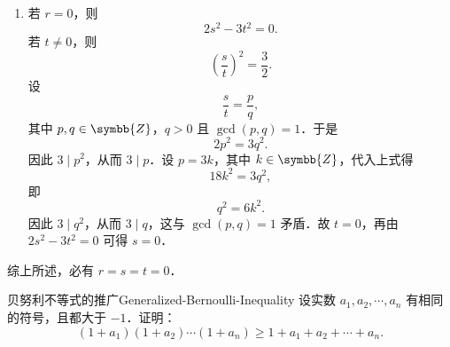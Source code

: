 \begin{myproof}
\begin{enumerate}
        \item 若 $r = 0$，则
              \begin{equation}
                  2s^2 - 3t^2 = 0.
              \end{equation}
              若 $t \neq 0$，则
              \begin{equation}
                  \left(\frac{s}{t}\right)^2 = \frac{3}{2}.
              \end{equation}
              设
              \begin{equation}
                  \frac{s}{t} = \frac{p}{q},
              \end{equation}
              其中 $p, q \in \symbb{Z}$，$q > 0$ 且 $\gcd(p,q) = 1$．于是
              \begin{equation}
                  2p^2 = 3q^2.
              \end{equation}
              因此 $3 \mid p^2$，从而 $3 \mid p$．设 $p = 3k$，其中
              $k \in \symbb{Z}$，代入上式得
              \begin{equation}
                  18k^2 = 3q^2,
              \end{equation}
              即
              \begin{equation}
                  q^2 = 6k^2.
              \end{equation}
              因此 $3 \mid q^2$，从而 $3 \mid q$，这与
              $\gcd(p,q) = 1$ 矛盾．故 $t = 0$，再由
              $2s^2 - 3t^2 = 0$ 可得 $s = 0$．
    \end{enumerate}

    综上所述，必有 $r = s = t = 0$．
\end{myproof}

\begin{problem}{贝努利不等式的推广}{Generalized-Bernoulli-Inequality}
    设实数 $a_1, a_2, \cdots, a_n$ 有相同的符号，且都大于 $-1$．证明：
    \begin{equation}
        (1 + a_1)(1 + a_2)\cdots(1 + a_n) \geqslant 1 + a_1 + a_2 + \cdots + a_n.
    \end{equation}
\end{problem}

